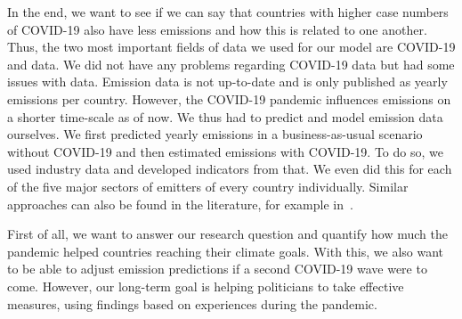 In the end, we want to see if we can say that countries with higher case numbers of COVID-19 also have less \co emissions and how this is related to one another.
Thus, the two most important fields of data we used for our model are COVID-19 and \co data. We did not have any problems regarding COVID-19 data but had some issues with \co data. Emission data is not up-to-date and is only published as yearly emissions per country. However, the COVID-19 pandemic influences emissions on a shorter time-scale as of now. We thus had to predict and model emission data ourselves.  We first predicted yearly \co emissions in a business-as-usual scenario without COVID-19 and then estimated \co emissions with COVID-19. To do so, we used industry data and developed indicators from that. We even did this for each of the five major sectors of \co emitters of every country individually. Similar approaches can also be found in the literature, for example in~\cite{LeQuere2020}.

First of all, we want to answer our research question and quantify how much the pandemic helped countries reaching their climate goals. With this, we also want to be able to adjust \co emission predictions if a second COVID-19 wave were to come.
However, our long-term goal is helping politicians to take effective measures, using findings based on experiences during the pandemic.